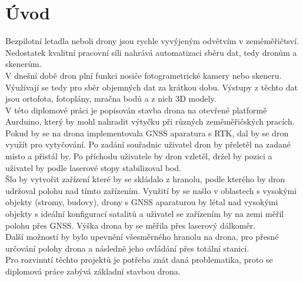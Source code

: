 \chapter{Úvod}
\label{1-uvod}

Bezpilotní letadla neboli drony jsou rychle vyvýjeným odvětvím v zeměměřičtsví. Nedostatek kvalitní pracovní síli nahrává automatizaci sběru dat, tedy dronům a skenerům.\\
V dnešní době dron plní funkci nosiče fotogrametrické kamery nebo skeneru. Výužívají se tedy pro sběr objemných dat za krátkou dobu. Výstupy z těchto dat jsou ortofota, fotoplány, mračna bodů a z nich 3D modely.\\
V této diplomové práci je popisován stavba drona na otevřené platformě Aurduino, který by mohl nahradit výtyčku při různých zeměměřičských pracích.\\
Pokud by se na drona implementovala GNSS aparatura s RTK, dal by se dron využít pro vytyčování. Po zadání souřadnic uživatel dron by přeletěl na zadané místo a přistál by. Po příchodu uživatele by dron vzletěl, držel by pozici a uživatel by podle laserové stopy stabilizoval bod.\\
Šlo by vytvořit zařízení které by se skládalo z hranolu, podle kterého by dron udržoval polohu nad tímto zařízením. Využití by se našlo v oblastech s vysokými objekty (stromy, budovy), drony s GNSS aparaturou by létal nad vysokými objekty s ideální konfigurací satalitů a uživatel se zařízením by na zemi měřil polohu přes GNSS. Výška drona by se měřila přes laserový dálkoměr.\\
Další možností by bylo upevnění všesměrného hranolu na drona, pro přesné určování polohy drona a následně jeho ovládání přes totální stanici.\\
Pro rozvinutí těchto projektů je potřeba znát daná problematika, proto se diplomová práce zabývá základní stavbou drona.\\